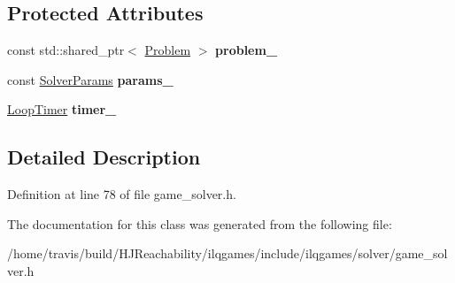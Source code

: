 \subsection*{Protected Attributes}
\begin{DoxyCompactItemize}
\item 
const std\+::shared\+\_\+ptr$<$ \hyperlink{classilqgames_1_1_problem}{Problem} $>$ {\bfseries problem\+\_\+}\hypertarget{classilqgames_1_1_game_solver_a3c1d8f6d4d9142d6bca23623391ca2c3}{}\label{classilqgames_1_1_game_solver_a3c1d8f6d4d9142d6bca23623391ca2c3}

\item 
const \hyperlink{structilqgames_1_1_solver_params}{Solver\+Params} {\bfseries params\+\_\+}\hypertarget{classilqgames_1_1_game_solver_adb70fc48a6420c1b516becd5c108a92a}{}\label{classilqgames_1_1_game_solver_adb70fc48a6420c1b516becd5c108a92a}

\item 
\hyperlink{classilqgames_1_1_loop_timer}{Loop\+Timer} {\bfseries timer\+\_\+}\hypertarget{classilqgames_1_1_game_solver_ae77a0725fdd98ec49f96ebf33d966650}{}\label{classilqgames_1_1_game_solver_ae77a0725fdd98ec49f96ebf33d966650}

\end{DoxyCompactItemize}


\subsection{Detailed Description}


Definition at line 78 of file game\+\_\+solver.\+h.



The documentation for this class was generated from the following file\+:\begin{DoxyCompactItemize}
\item 
/home/travis/build/\+H\+J\+Reachability/ilqgames/include/ilqgames/solver/game\+\_\+solver.\+h\end{DoxyCompactItemize}
